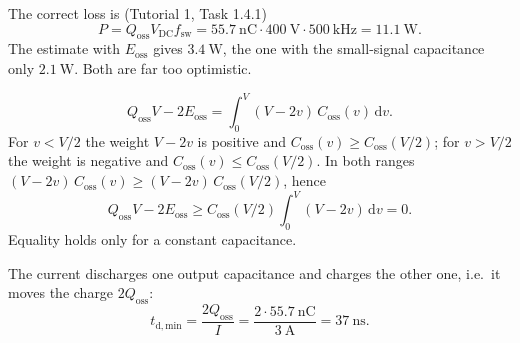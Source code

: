 
\begin{solutionblock}
	The correct loss is (Tutorial 1, Task 1.4.1)
	\begin{equation}
		P = Q_\mathrm{oss}V_\mathrm{DC}f_\mathrm{sw} = \SI{55.7}{\nano\coulomb}\cdot\SI{400}{\volt}\cdot\SI{500}{\kilo\hertz} = \SI{11.1}{\watt}.
	\end{equation}
	The estimate with $E_\mathrm{oss}$ gives $\SI{3.4}{\watt}$, the one with the small-signal capacitance only $\SI{2.1}{\watt}$. Both are far too optimistic.
\end{solutionblock}


\begin{solutionblock}
	\begin{equation}
		Q_\mathrm{oss}V-2E_\mathrm{oss} = \int_0^V (V-2v)\,C_\mathrm{oss}(v)\,\mathrm{d}v.
	\end{equation}
	For $v<V/2$ the weight $V-2v$ is positive and $C_\mathrm{oss}(v)\geq C_\mathrm{oss}(V/2)$; for $v>V/2$ the weight is negative and $C_\mathrm{oss}(v)\leq C_\mathrm{oss}(V/2)$. In both ranges $(V-2v)\,C_\mathrm{oss}(v)\geq (V-2v)\,C_\mathrm{oss}(V/2)$, hence
	\begin{equation}
		Q_\mathrm{oss}V-2E_\mathrm{oss} \geq C_\mathrm{oss}(V/2)\int_0^V (V-2v)\,\mathrm{d}v = 0.
	\end{equation}
	Equality holds only for a constant capacitance.
\end{solutionblock}


\begin{solutionblock}
	The current discharges one output capacitance and charges the other one, i.e.\ it moves the charge $2Q_\mathrm{oss}$:
	\begin{equation}
		t_\mathrm{d,min} = \frac{2Q_\mathrm{oss}}{I} = \frac{2\cdot\SI{55.7}{\nano\coulomb}}{\SI{3}{\ampere}} = \SI{37}{\nano\second}.
	\end{equation}
\end{solutionblock}

